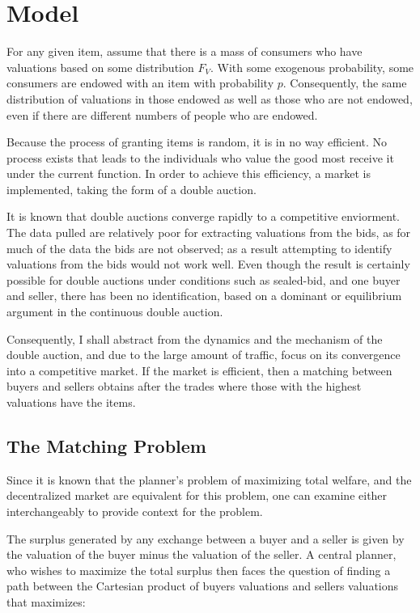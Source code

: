 \documentclass[12pt, letterpaper]{paper}
\begin{document}
\section{Model}
\label{sec-2}

For any given item, assume that there is a mass of consumers who have
valuations based on some distribution $F_V$. With some exogenous
probability, some consumers are endowed with an item with probability
$p$. Consequently, the same distribution of valuations in those
endowed as well as those who are not endowed, even if there are
different numbers of people who are endowed. 

Because the process of granting items is random, it is in no way
efficient. No process exists that leads to the individuals who
value the good most receive it under the current function. In order to
achieve this efficiency, a market is implemented, taking the form
of a double auction.

It is known that double auctions  converge rapidly to a competitive
enviorment. The data pulled are relatively poor for extracting
valuations from the bids, as for much of the data the bids are not
observed; as a result attempting to identify valuations from the bids
would not work well. Even though the result is certainly possible for
double auctions under conditions such as sealed-bid, and one buyer and
seller, there has been no identification, based on a dominant or
equilibrium argument in the continuous double auction. 

Consequently, I shall abstract from the dynamics and the
mechanism of the double auction, and due to the large amount of
traffic, focus on its convergence into a competitive market. If the
market is efficient, then a matching between buyers and
sellers obtains after the trades where those with the highest
valuations have the items.

\subsection{The Matching Problem}
\label{sec-2-1}
Since it is known that the planner's problem of maximizing total
welfare, and the decentralized market are equivalent for this problem,
one can examine either interchangeably to provide context for the
problem.

The surplus generated by any exchange between a buyer and a seller is
given by the valuation of the buyer minus the valuation of the
seller. A central planner, who wishes to maximize the total surplus
then faces the question of finding a path between the Cartesian
product of buyers valuations and sellers valuations that maximizes:
\end{document}
